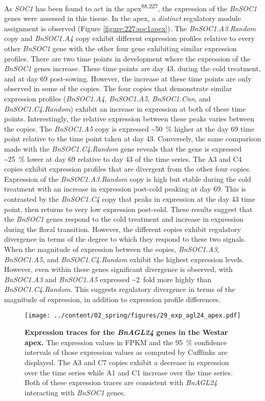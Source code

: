 \documentclass[12pt,]{book}
\begin{document}
As \emph{SOC1} has been found to act in the
apex\textsuperscript{88,227}, the expression of the \emph{BnSOC1} genes
were assessed in this tissue. In the apex, a \emph{distinct} regulatory
module assignment is observed (Figure \ref{figure:227:soc1apex}). The
\emph{BnSOC1.A3.Random} copy and \emph{BnSOC1.A4} copy exhibit different
expression profiles relative to every other \emph{BnSOC1} gene with the
other four gene exhibiting similar expression profiles. There are two
time points in development where the expression of the \emph{BnSOC1}
genes increase. These time points are day 43, during the cold treatment,
and at day 69 post-sowing. However, the increase at these time points
are only observed in some of the copies. The four copies that
demonstrate similar expression profiles (\emph{BnSOC1.A4},
\emph{BnSOC1.A5}, \emph{BnSOC1.Cnn}, and \emph{BnSOC1.C4.Random})
exhibit an increase in expression at both of these time points.
Interestingly, the relative expression between these peaks varies
between the copies. The \emph{BnSOC1.A5} copy is expressed
\textasciitilde{}50~\% higher at the day 69 time point relative to the
time point taken at day 43. Conversely, the same comparison made with
the \emph{BnSOC1.C4.Random} gene reveals that the gene is expressed
\textasciitilde{}25~\% lower at day 69 relative to day 43 of the time
series. The A3 and C4 copies exhibit expression profiles that are
divergent from the other four copies. Expression of the
\emph{BnSOC1.A3.Random} copy is high but stable during the cold
treatment with an increase in expression post-cold peaking at day 69.
This is contrasted by the \emph{BnSOC1.C4} copy that peaks in expression
at the day 43 time point, then returns to very low expression post-cold.
These results suggest that the \emph{BnSOC1} genes respond to the cold
treatment and increase in expression during the floral transition.
However, the different copies exhibit regulatory divergence in terms of
the degree to which they respond to these two signals. When the
magnitude of expression between the copies, \emph{BnSOC1.A3},
\emph{BnSOC1.A5}, and \emph{BnSOC1.C4.Random} exhibit the highest
expression levels. However, even within these genes significant
divergence is observed, with \emph{BnSOC1.A3} and \emph{BnSOC1.A5}
expressed \textasciitilde{}2~fold more highly than
\emph{BnSOC1.C4.Random}. This suggests regulatory divergence in terms of
the magnitude of expression, in addition to expression profile
differences.

\begin{figure}[htbp]
\centering
\texttt{[image: ../content/02\_spring/figures/29\_exp\_agl24\_apex.pdf]}
\caption{\textbf{Expression traces for the \emph{BnAGL24} genes in the
Westar apex.} The expression values in FPKM and the 95~\% confidence
intervals of those expression values as computed by Cufflinks are
displayed. The A3 and C7 copies exhibit a decrease in expression over
the time series while A1 and C1 increase over the time series. Both of
these expression traces are consistent with \emph{BnAGL24} interacting
with \emph{BnSOC1} genes.}\label{figure:229:agl24apex}
\end{figure}
\end{document}
